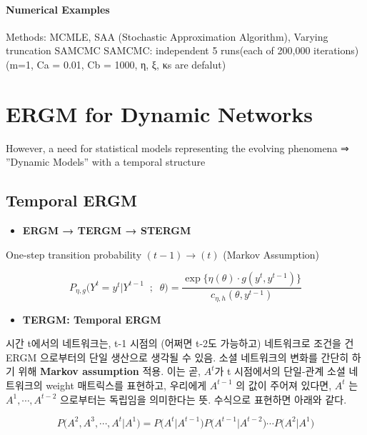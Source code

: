 \documentclass[
]{book}
\providecommand{\tightlist}{%
  \setlength{\itemsep}{0pt}\setlength{\parskip}{0pt}}
\begin{document}
{{{\hypertarget{numerical-examples}{%
\paragraph{Numerical Examples}\label{numerical-examples}}

Methods: MCMLE, SAA (Stochastic Approximation Algorithm), Varying truncation SAMCMC
SAMCMC: independent 5 runs(each of 200,000 iterations) (m=1, Ca = 0.01, Cb = 1000, η, ξ, κs are defalut)

\hypertarget{ergm-for-dynamic-networks}{%
\section{ERGM for Dynamic Networks}\label{ergm-for-dynamic-networks}}

However, a need for statistical models representing the evolving phenomena ⇒ ''Dynamic Models'' with a temporal structure

\hypertarget{temporal-ergm}{%
\subsection{Temporal ERGM}\label{temporal-ergm}}

\begin{itemize}
\tightlist
\item
  \textbf{ERGM → TERGM → STERGM}
\end{itemize}

One-step transition probability \((t-1) → (t)\) (Markov Assumption)

\[
P_{\eta, g} \Big ( Y^t = y^t \Big | Y^{t-1} \; \; ; \; \; \theta \Big ) = \frac{\exp \Big \{ \eta(\theta) \cdot g(y^t, y^{t-1})\Big  \}}{c_{\eta, h}(\theta, y^{t-1})}
\]

\begin{itemize}
\tightlist
\item
  \textbf{TERGM: Temporal ERGM}
\end{itemize}

시간 t에서의 네트워크는, t-1 시점의 (어쩌면 t-2도 가능하고) 네트워크로 조건을 건 ERGM 으로부터의 단일 생산으로 생각될 수 있음. 소셜 네트워크의 변화를 간단히 하기 위해 \textbf{Markov assumption} 적용. 이는 곧, \(A^t\)가 t 시점에서의 단일-관계 소셜 네트워크의 weight 매트릭스를 표현하고, 우리에게 \(A^{t-1}\) 의 값이 주어져 있다면, \(A^t\) 는 \(A^1, \cdots, A^{t-2}\) 으로부터는 독립임을 의미한다는 뜻. 수식으로 표현하면 아래와 같다.

\[
P\Big(A^2, A^3, \cdots, A^t \Big | A^1 \Big ) = P\Big(A^t \Big | A^{t-1} \Big ) P\Big(A^{t-1} \Big | A^{t-2} \Big ) \cdots P\Big(A^2 \Big | A^1 \Big ) \tag{Temporal ERGM}
\]

}}}
\end{document}
